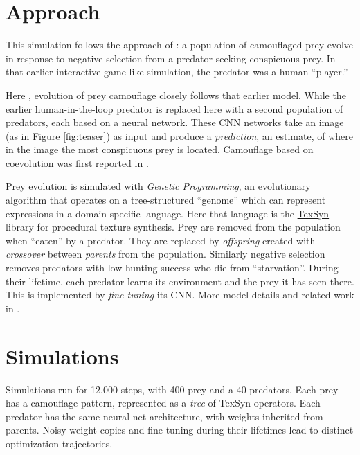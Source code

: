\documentclass[sigconf]{acmart}
\newcommand{\jargon}[1]{\textit{#1}}
\begin{document}

\section{Approach}

This simulation follows the approach of \citet{reynolds_iec_2011}: a population of camouflaged prey evolve in response to negative selection from a predator seeking conspicuous prey. In that earlier interactive game-like simulation, the predator was a human “player.” 
\par
Here \cite{reynolds_coevolution_2023}, evolution of prey camouflage closely follows that earlier model. While the earlier human-in-the-loop predator is replaced here with a second population of predators, each based on a neural network. These CNN networks take an image (as in Figure \ref{fig:teaser}) as input and produce a \jargon{prediction}, an estimate, of where in the image the most conspicuous prey is located. Camouflage based on coevolution was first reported in \citet{harrington_coevolution_2014}.
\par
Prey evolution is simulated with \jargon{Genetic Programming}, an evolutionary algorithm that operates on a tree-structured “genome” which can represent expressions in a domain specific language. Here that language is the \href{https://github.com/cwreynolds/TexSyn}{TexSyn} library for procedural texture synthesis. Prey are removed from the population when “eaten” by a predator. They are replaced by \jargon{offspring} created with \jargon{crossover} between \jargon{parents} from the population. Similarly negative selection removes predators with low hunting success who die from “starvation”. During their lifetime, each predator learns its environment and the prey it has seen there. This is implemented by \jargon{fine tuning} its CNN. More model details and related work in \citet{reynolds_coevolution_2023}.
\par


\section{Simulations}

Simulations run for 12,000 steps, with 400 prey and a 40 predators.  Each prey has a camouflage pattern, represented as a \jargon{tree} of TexSyn operators. Each predator has the same neural net architecture, with weights inherited from parents. Noisy weight copies and fine-tuning during their lifetimes lead to distinct optimization trajectories.
\par
\end{document}
